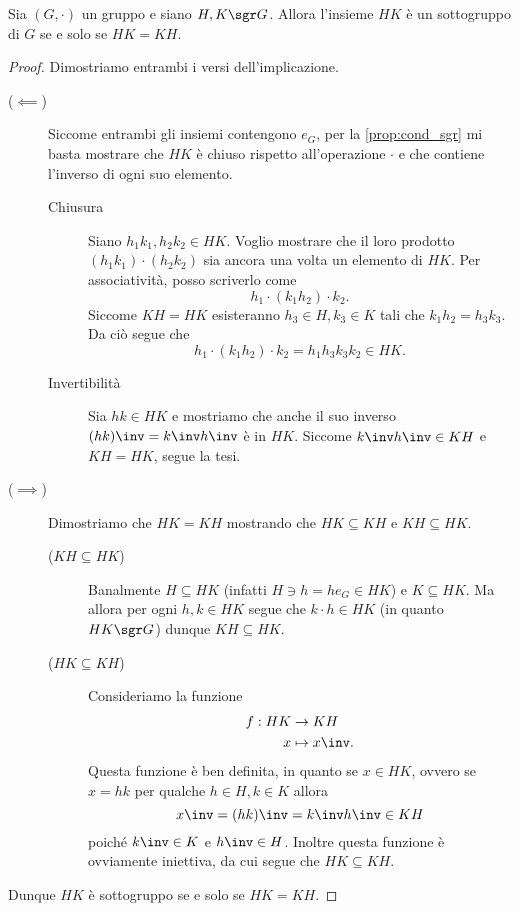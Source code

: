 \begin{proposition} 
    \label{prop:cond_prod_sgr_e'_sgr}
    Sia $(G, \cdot)$ un gruppo e siano $H,K \sgr G$.
    Allora l'insieme $HK$ è un sottogruppo di $G$ se e solo se $HK = KH$.
\end{proposition}
\begin{proof}
    Dimostriamo entrambi i versi dell'implicazione.
    \begin{description}
        \item[($\impliedby$)] Siccome entrambi gli insiemi contengono $e_G$, per la \autoref{prop:cond_sgr} mi basta mostrare che $HK$ è chiuso rispetto all'operazione $\cdot$ e che contiene l'inverso di ogni suo elemento. 
        \begin{description}
            \item[Chiusura] Siano $h_1k_1, h_2k_2 \in HK$. Voglio mostrare che il loro prodotto $(h_1k_1) \cdot (h_2k_2)$ sia ancora una volta un elemento di $HK$. Per associatività, posso scriverlo come \[
                h_1 \cdot (k_1h_2) \cdot k_2.    
            \] Siccome $KH = HK$ esisteranno $h_3 \in H, k_3 \in K$ tali che $k_1h_2 = h_3k_3$. Da ciò segue che \[
                h_1 \cdot (k_1h_2) \cdot k_2 = h_1h_3k_3k_2 \in HK.
            \]
            \item[Invertibilità] Sia $hk \in HK$ e mostriamo che anche il suo inverso $(hk)\inv = k\inv h\inv$ è in $HK$. Siccome $k\inv h\inv \in KH$ e $KH = HK$, segue la tesi.
        \end{description}
        \item[($\implies$)] Dimostriamo che $HK = KH$ mostrando che $HK \subseteq KH$ e $KH \subseteq HK$.
        \begin{description}
            \item[($KH \subseteq HK$)] Banalmente $H \subseteq HK$ (infatti $H \ni h = he_G \in HK$) e $K \subseteq HK$. Ma allora per ogni $h, k \in HK$ segue che $k \cdot h \in HK$ (in quanto $HK \sgr G$) dunque $KH \subseteq HK$.
            \item[($HK \subseteq KH$)] Consideriamo la funzione \begin{align*}
                f : HK &\to KH\\
                x &\mapsto x\inv.
            \end{align*} Questa funzione è ben definita, in quanto se $x \in HK$, ovvero se $x = hk$ per qualche $h \in H, k \in K$ allora \[
                x\inv = (hk)\inv = k\inv h\inv \in KH    
            \] poiché $k\inv \in K$ e $h\inv \in H$. Inoltre questa funzione è ovviamente iniettiva, da cui segue che $HK \subseteq KH$.
        \end{description}
    \end{description}
    Dunque $HK$ è sottogruppo se e solo se $HK = KH$.
\end{proof}
